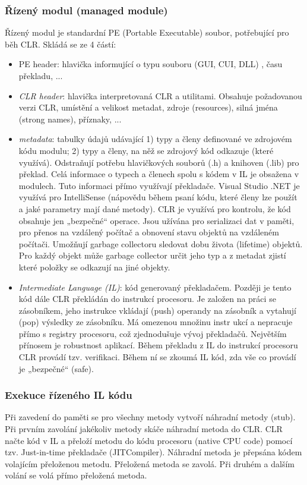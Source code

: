 \subsubsection*{Řízený modul (managed module)}
Řízený modul je standardní PE (Portable Executable) soubor, potřebující pro běh CLR. Skládá se ze 4 částí:
\begin{itemize}
\item {PE header}: hlavička informující o typu souboru (GUI, CUI, DLL) , času překladu, ...
\item \textit{CLR header}: hlavička interpretovaná CLR a utilitami. Obsahuje
požadovanou verzi CLR, umístění a velikost metadat, zdroje (resources), silná jména (strong names), příznaky, ...
\item \textit{metadata}: tabulky údajů udávající 1) typy a členy definované ve zdrojovém kódu modulu; 2) typy a členy, na něž se zdrojový kód odkazuje (které využívá). Odstraňují potřebu hlavičkových souborů (.h) a knihoven (.lib) pro překlad. Celá informace o typech a členech spolu s kódem v IL je obsažena v modulech. Tuto informaci přímo využívají překladače. Visual Studio .NET je využívá pro IntelliSense (nápovědu během psaní kódu, které členy lze použít a jaké parametry mají dané metody). CLR je využívá pro kontrolu, že kód obsahuje jen „bezpečné“ operace. Jsou užívána pro serializaci dat v paměti, pro přenos na vzdálený počítač a obnovení stavu objektů na vzdáleném počítači. Umožňují garbage collectoru sledovat dobu života (lifetime) objektů. Pro každý objekt může garbage collector určit jeho typ a z metadat zjistí které položky se odkazují na jiné objekty.
\item \textit{Intermediate Language (IL)}: kód generovaný překladačem. Později je tento kód dále CLR překládán do instrukcí procesoru. Je založen na práci se zásobníkem, jeho instrukce vkládají (push) operandy na zásobník a vytahují (pop) výsledky ze zásobníku. Má omezenou množinu instr ukcí a nepracuje přímo s registry procesoru, což zjednodušuje vývoj překladačů. Největším přínosem je robustnost aplikací. Během překladu z IL do instrukcí procesoru CLR provádí tzv. verifikaci. Během ní se zkoumá IL kód, zda vše co provádí je „bezpečné“ (safe).
\end{itemize}

\subsubsection*{Exekuce řízeného IL kódu}
Při zavedení do paměti se pro všechny metody vytvoří náhradní metody (stub). Při prvním zavolání jakékoliv metody skáče náhradní metoda do CLR. CLR načte kód v IL a přeloží metodu do kódu procesoru (native CPU code) pomocí tzv. Just-in-time překladače (JITCompiler). Náhradní metoda je přepsána kódem volajícím přeloženou metodu. Přeložená metoda se zavolá. Při druhém a dalším volání se volá přímo přeložená metoda.

